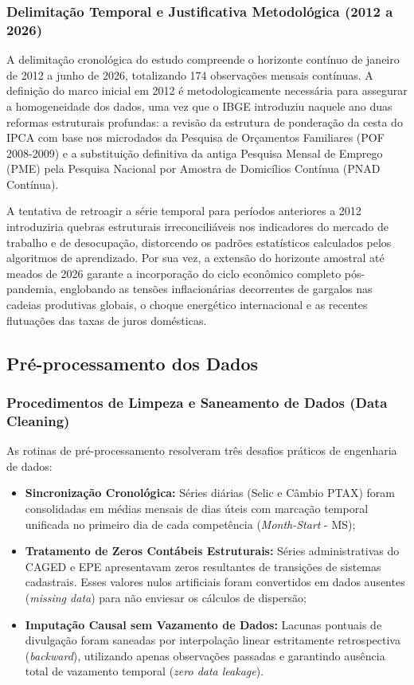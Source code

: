 \documentclass[10pt,twoside]{article}
\begin{document}
\subsubsection{Delimitação Temporal e Justificativa Metodológica (2012 a 2026)}
A delimitação cronológica do estudo compreende o horizonte contínuo de janeiro de 2012 a junho de 2026, totalizando 174 observações mensais contínuas. A definição do marco inicial em 2012 é metodologicamente necessária para assegurar a homogeneidade dos dados, uma vez que o IBGE introduziu naquele ano duas reformas estruturais profundas: a revisão da estrutura de ponderação da cesta do IPCA com base nos microdados da Pesquisa de Orçamentos Familiares (POF 2008-2009) e a substituição definitiva da antiga Pesquisa Mensal de Emprego (PME) pela Pesquisa Nacional por Amostra de Domicílios Contínua (PNAD Contínua). 

A tentativa de retroagir a série temporal para períodos anteriores a 2012 introduziria quebras estruturais irreconciliáveis nos indicadores do mercado de trabalho e de desocupação, distorcendo os padrões estatísticos calculados pelos algoritmos de aprendizado. Por sua vez, a extensão do horizonte amostral até meados de 2026 garante a incorporação do ciclo econômico completo pós-pandemia, englobando as tensões inflacionárias decorrentes de gargalos nas cadeias produtivas globais, o choque energético internacional e as recentes flutuações das taxas de juros domésticas.

\subsection{Pré-processamento dos Dados}
\subsubsection{Procedimentos de Limpeza e Saneamento de Dados (Data Cleaning)}
As rotinas de pré-processamento resolveram três desafios práticos de engenharia de dados:
\begin{itemize}[leftmargin=1.5em]
    \item \textbf{Sincronização Cronológica:} Séries diárias (Selic e Câmbio PTAX) foram consolidadas em médias mensais de dias úteis com marcação temporal unificada no primeiro dia de cada competência (\textit{Month-Start} - MS);
    \item \textbf{Tratamento de Zeros Contábeis Estruturais:} Séries administrativas do CAGED e EPE apresentavam zeros resultantes de transições de sistemas cadastrais. Esses valores nulos artificiais foram convertidos em dados ausentes (\textit{missing data}) para não enviesar os cálculos de dispersão;
    \item \textbf{Imputação Causal sem Vazamento de Dados:} Lacunas pontuais de divulgação foram saneadas por interpolação linear estritamente retrospectiva (\textit{backward}), utilizando apenas observações passadas e garantindo ausência total de vazamento temporal (\textit{zero data leakage}).
\end{itemize}
\end{document}
